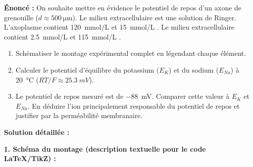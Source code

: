 \documentclass[11pt]{article}
\begin{document}
\begin{exoresolu}
\textbf{Énoncé :} On souhaite mettre en évidence le potentiel de repos d'un axone de grenouille ($d \approx \SI{500}{\micro\meter}$). Le milieu extracellulaire est une solution de Ringer. L'axoplasme contient \SI{120}{mmol/L}  et \SI{15}{mmol/L} . Le milieu extracellulaire contient \SI{2.5}{mmol/L}  et \SI{115}{mmol/L} .
\begin{enumerate}
    \item Schématiser le montage expérimental complet en légendant chaque élément.
    \item Calculer le potentiel d'équilibre du potassium ($E_K$) et du sodium ($E_{Na}$) à \SI{20}{\celsius} ($RT/F \approx \SI{25.3}{mV}$).
    \item Le potentiel de repos mesuré est de \SI{-88}{mV}. Comparer cette valeur à $E_K$ et $E_{Na}$. En déduire l'ion principalement responsable du potentiel de repos et justifier par la perméabilité membranaire.
\end{enumerate}

\tcblower
\textbf{Solution détaillée :}

\textbf{1. Schéma du montage (description textuelle pour le code LaTeX/TikZ) :}
\begin{popfigure}
\end{popfigure}
\end{exoresolu}
\end{document}
